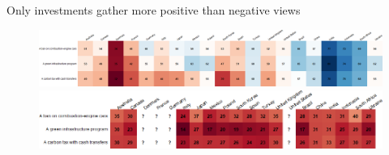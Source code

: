 \begin{frame}{Only investments gather more positive than negative views}%
	\begin{figure}[h!]
	\centering
	\caption{%
	Do you agree or disagree with the following statement? \textit{The policy} would have a \textcolor{blue}{\textbf{large} effect on the French economy and employment}.}
	\includegraphics[width=\textwidth]{../figures/country_comparison/policies_large_effect_positive_countries.png}
	\vspace{-.1cm}
	\centering %
	\caption{%
	Do you agree or disagree with the following statement? \textit{The policy} would have a \textcolor{blue}{\textbf{positive [or \textit{not} negative]} effect on the French economy and employment}.}
	\includegraphics[width=\textwidth]{../figures/country_comparison/policies_positive_negative_positive_countries.png}
	\caption{}
	\end{figure}
\end{frame}
	

